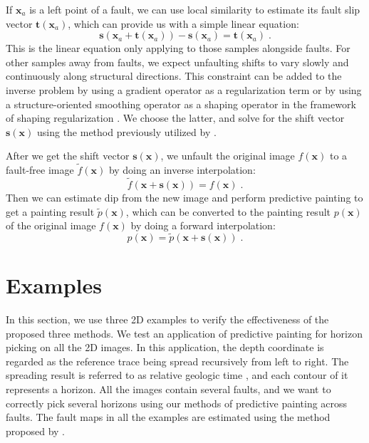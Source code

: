 If $\mathbf x_a$ is a left point of a fault, we can use local similarity to estimate its fault slip vector $\mathbf t(\mathbf x_a)$, which can provide us with a simple linear equation:
\begin{equation}
	\label{eq:slip}
	\mathbf s(\mathbf x_a + \mathbf t(\mathbf x_a)) - \mathbf s(\mathbf x_a) = \mathbf t(\mathbf x_a) \; .
\end{equation}
This is the linear equation only applying to those samples alongside faults.
For other samples away from faults, we expect unfaulting shifts to vary slowly and continuously along structural directions.
This constraint can be added to the inverse problem by using a gradient operator as a regularization term \cite[]{wu16} or by using a structure-oriented smoothing operator as a shaping operator in the framework of shaping regularization \cite[]{fomel07}.
We choose the latter, and solve for the shift vector $\mathbf s (\mathbf x)$ using the method previously utilized by \cite{xue16}.

After we get the shift vector $\mathbf s (\mathbf x)$, we unfault the original image $f(\mathbf x)$ to a fault-free image $\tilde{f} (\mathbf x)$ by doing an inverse interpolation:
\begin{equation}
	\label{eq:inverse}
	\tilde{f} (\mathbf x + \mathbf s (\mathbf x)) = f(\mathbf x) \; .
\end{equation}
Then we can estimate dip from the new image and perform predictive painting to get a painting result $\tilde{p} (\mathbf x)$,
which can be converted to the painting result $p(\mathbf x)$ of the original image $f(\mathbf x)$ by doing a forward interpolation:
\begin{equation}
	\label{eq:forward}
	p(\mathbf x) = \tilde{p} (\mathbf x + \mathbf s (\mathbf x)) \; .
\end{equation}

\section{Examples}

In this section, we use three 2D examples to verify the effectiveness of the proposed three methods.
We test an application of predictive painting for horizon picking on all the 2D images. 
In this application, the depth coordinate is regarded as the reference trace being spread recursively from left to right.
The spreading result is referred to as relative geologic time \cite[]{stark04}, and each contour of it represents a horizon.
All the images contain several faults, and we want to correctly pick several horizons using our methods of predictive painting across faults.
The fault maps in all the examples are estimated using the method proposed by \cite{wu16a}.

